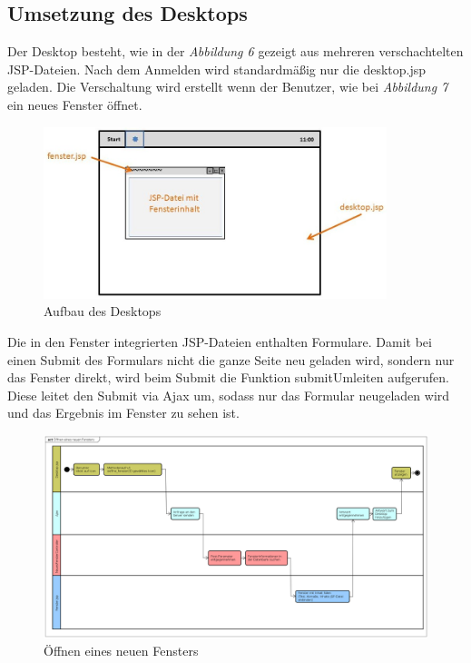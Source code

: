 \documentclass[12pt, a4paper]{article}
\begin{document}
\subsection{Umsetzung des Desktops}
Der Desktop besteht, wie in der \textit{Abbildung 6} gezeigt aus mehreren verschachtelten JSP-Dateien. Nach dem Anmelden wird standardmäßig nur die \glqq desktop.jsp\grqq{} geladen. Die Verschaltung wird erstellt wenn der Benutzer, wie bei \textit{Abbildung 7} ein neues Fenster öffnet.

\begin{figure}[H]
	\begin{center}
		\includegraphics[width=100mm]{Bilder/desktop.jpg}
	\end{center}
	\caption{Aufbau des Desktops}
\end{figure}

Die in den Fenster integrierten JSP-Dateien enthalten Formulare. Damit bei einen Submit des Formulars nicht die ganze Seite neu geladen wird, sondern nur das Fenster direkt, wird beim Submit die Funktion \glqq submitUmleiten\grqq{} aufgerufen. Diese leitet den Submit via Ajax um, sodass nur das Formular neugeladen wird und das Ergebnis im Fenster zu sehen ist.


\begin{figure}[H]
	\begin{center}
		\includegraphics[width=220mm,angle=90]{Bilder/fenster_oeffnen.png}
	\end{center}
	\caption{Öffnen eines neuen Fensters}
\end{figure}
\end{document}
